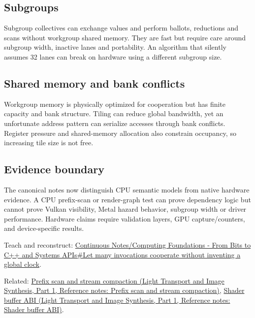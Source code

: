 \subsection{Subgroups}\label{appendix-f662b5b1773b-subgroups}

\hypertarget{appendix-f662b5b1773b-subgroups}{}

Subgroup collectives can exchange values and perform ballots, reductions and scans without workgroup shared memory. They are fast but require care around subgroup width, inactive lanes and portability. An algorithm that silently assumes 32 lanes can break on hardware using a different subgroup size.

\subsection{Shared memory and bank conflicts}\label{appendix-f662b5b1773b-shared-memory-and-bank-conflicts}

\hypertarget{appendix-f662b5b1773b-shared-memory-and-bank-conflicts}{}

Workgroup memory is physically optimized for cooperation but has finite capacity and bank structure. Tiling can reduce global bandwidth, yet an unfortunate address pattern can serialize accesses through bank conflicts. Register pressure and shared-memory allocation also constrain occupancy, so increasing tile size is not free.

\subsection{Evidence boundary}\label{appendix-f662b5b1773b-evidence-boundary}

\hypertarget{appendix-f662b5b1773b-evidence-boundary}{}

The canonical notes now distinguish CPU semantic models from native hardware evidence. A CPU prefix-scan or render-graph test can prove dependency logic but cannot prove Vulkan visibility, Metal hazard behavior, subgroup width or driver performance. Hardware claims require validation layers, GPU capture/counters, and device-specific results.

Teach and reconstruct: \hyperref[01-foundations-i-ch008-let-many-invocations-cooperate-without-inventing-a-global-clock]{Continuous Notes/Computing Foundations - From Bits to C++ and Systems APIs\#Let many invocations cooperate without inventing a global clock}.

Related: \href{../04-Light-Transport-and-Image-Synthesis-P01/main.pdf\#appendix-f2ee4d086415}{Prefix scan and stream compaction (Light Transport and Image Synthesis, Part 1, Reference notes: Prefix scan and stream compaction)}, \href{../04-Light-Transport-and-Image-Synthesis-P01/main.pdf\#appendix-749048795dbb}{Shader buffer ABI (Light Transport and Image Synthesis, Part 1, Reference notes: Shader buffer ABI)}.
